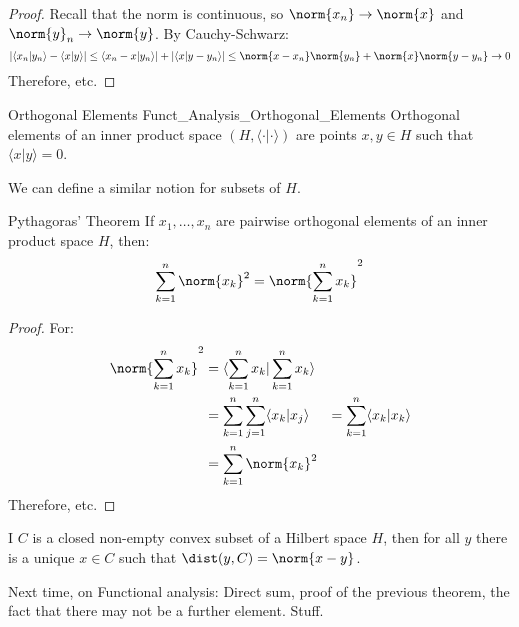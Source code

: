         \begin{proof}
            Recall that the norm is continuous, so
            $\norm{x_{n}}\rightarrow\norm{x}$ and
            $\norm{y}_{n}\rightarrow\norm{y}$. By Cauchy-Schwarz:
            \begin{equation}
                |\langle{x_{n}|y_{n}}\rangle-\langle{x|y}\rangle|
                \leq\langle{x_{n}-x|y_{n}}\rangle|+
                    |\langle{x|y-y_{n}}\rangle|
                \leq\norm{x-x_{n}}\norm{y_{n}}+
                    \norm{x}\norm{y-y_{n}}
                \rightarrow{0}
            \end{equation}
            Therefore, etc.
        \end{proof}
        \begin{ldefinition}{Orthogonal Elements}
              {Funct_Analysis_Orthogonal_Elements}
            Orthogonal elements of an inner product space
            $(H,\langle{\cdot|\cdot}\rangle)$ are points
            $x,y\in{H}$ such that
            $\langle{x|y}\rangle=0$.
        \end{ldefinition}
        We can define a similar notion for subsets of $H$.
        \begin{ltheorem}{Pythagoras' Theorem}
            If $x_{1},\dots,x_{n}$ are pairwise orthogonal
            elements of an inner product space $H$, then:
            \begin{equation}
                \sum_{k=1}^{n}\norm{x_{k}}^{2}=
                \norm{\sum_{k=1}^{n}x_{k}}^{2}
            \end{equation}
        \end{ltheorem}
        \begin{proof}
            For:
            \begin{align}
                \norm{\sum_{k=1}^{n}x_{k}}^{2}
                &=\langle{\sum_{k=1}^{n}x_{k}|\sum_{k=1}^{n}x_{k}}
                    \rangle\\
                &=\sum_{k=1}^{n}\sum_{j=1}^{n}
                    \langle{x_{k}|x_{j}}\rangle
                &=\sum_{k=1}^{n}\langle{x_{k}|x_{k}}\rangle\\
                &=\sum_{k=1}^{n}\norm{x_{k}}^{2}
            \end{align}
            Therefore, etc.
        \end{proof}
        \begin{theorem}
            I $C$ is a closed non-empty convex subset of a Hilbert
            space $H$, then for all $y$ there is a unique
            $x\in{C}$ such that $\dist(y,C)=\norm{x-y}$.
        \end{theorem}
        Next time, on Functional analysis:
        Direct sum, proof of the previous theorem, the fact
        that there may not be a further element. Stuff.
